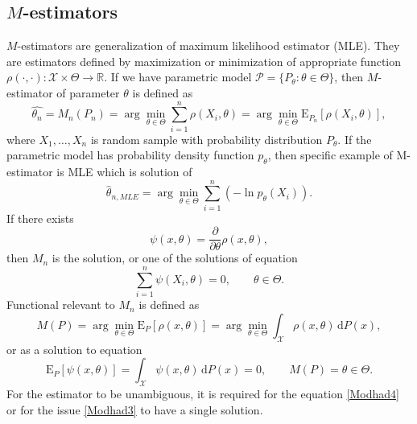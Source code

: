 \subsection{\texorpdfstring{$M$}{M}-estimators}
$M$-estimators are generalization of maximum likelihood estimator (MLE). They are estimators defined by maximization or minimization of appropriate function $\rho(\cdot,\cdot):\mathcal{X}\times \Theta \rightarrow \mathbb{R}$. If we have parametric model $\mathcal{P} = \lbrace P_\theta : \theta \in \Theta\rbrace$, then $M$-estimator of parameter $\theta$ is defined as 
\begin{equation}
	\hat{\theta_n} = M_n(P_n) = \arg \min_{\theta \in \Theta} \sum_{i=1}^n \rho(X_i,\theta) = \arg \min_{\theta \in \Theta} \mathrm{E}_{P_n}\left[ \rho(X_i,\theta) \right],
	\label{Modhad1}
\end{equation}
where $X_1,\ldots,X_n$ is random sample with probability distribution  $P_\theta$. If the parametric model has probability density function $p_\theta$, then specific example of M-estimator is MLE which is solution of
\begin{equation}
	\hat{\theta}_{n, MLE} = \arg\min_{\theta \in \Theta} \sum_{i=1}^n \left( -\ln p_\theta(X_i)\right).
\end{equation}
If there exists
\begin{equation}
	\psi(x,\theta) = \frac{\partial}{\partial \theta} \rho(x,\theta), 
\end{equation}
then $M_n$ is the solution, or one of the solutions of equation 
\begin{equation}
	\sum_{i=1}^n \psi(X_i,\theta) = 0, \qquad \theta \in \Theta.
	\label{Modhad2}
\end{equation}
Functional relevant to $M_n$ is defined as 
\begin{equation}
	M(P) = \arg \min_{\theta \in \Theta} \mathrm{E}_{P}\left[ \rho(x,\theta) \right] = \arg \min_{\theta \in \Theta} \int_\mathcal{X} \rho(x,\theta) \, \mathrm{d}P(x),
	\label{Modhad3}
\end{equation}
or as a solution to equation 
\begin{equation}
\mathrm{E}_{P}\left[ \psi(x,\theta) \right] =  \int_\mathcal{X} \psi(x,\theta) \, \mathrm{d}P(x) = 0, \qquad M(P) = \theta \in \Theta.
\label{Modhad4}
\end{equation}
For the estimator to be unambiguous, it is required for the equation \ref{Modhad4} or for the issue  \ref{Modhad3} to have a single solution.


